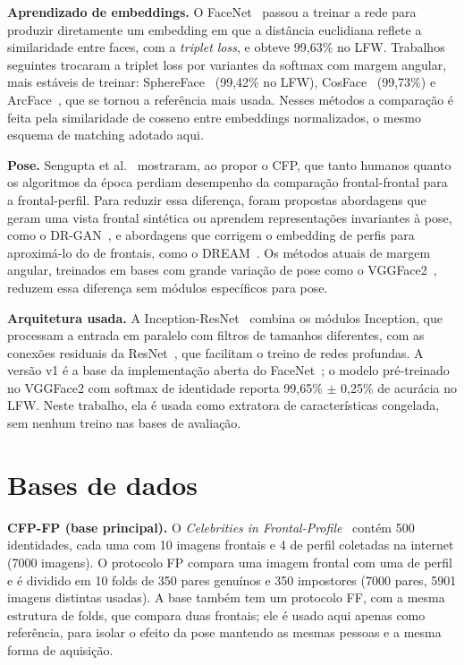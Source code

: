 \documentclass[conference,a4paper]{IEEEtran}
\begin{document}
\textbf{Aprendizado de embeddings.} O FaceNet~\cite{schroff2015facenet} passou a
treinar a rede para produzir diretamente um embedding em que a distância euclidiana
reflete a similaridade entre faces, com a \emph{triplet loss}, e obteve 99,63\% no
LFW. Trabalhos seguintes trocaram a triplet loss por variantes da softmax com margem
angular, mais estáveis de treinar: SphereFace~\cite{liu2017sphereface} (99,42\% no
LFW), CosFace~\cite{wang2018cosface} (99,73\%) e ArcFace~\cite{deng2019arcface}, que
se tornou a referência mais usada. Nesses métodos a comparação é feita pela
similaridade de cosseno entre embeddings normalizados, o mesmo esquema de matching
adotado aqui.

\textbf{Pose.} Sengupta et al.~\cite{sengupta2016frontal} mostraram, ao propor o CFP,
que tanto humanos quanto os algoritmos da época perdiam desempenho da comparação
frontal-frontal para a frontal-perfil. Para reduzir essa diferença, foram propostas
abordagens que geram uma vista frontal sintética ou aprendem representações
invariantes à pose, como o DR-GAN~\cite{tran2017disentangled}, e abordagens que
corrigem o embedding de perfis para aproximá-lo do de frontais, como o
DREAM~\cite{cao2018pose}. Os métodos atuais de margem angular, treinados em bases com
grande variação de pose como o VGGFace2~\cite{cao2018vggface2}, reduzem essa
diferença sem módulos específicos para pose.

\textbf{Arquitetura usada.} A Inception-ResNet~\cite{szegedy2017inception} combina os
módulos Inception, que processam a entrada em paralelo com filtros de tamanhos
diferentes, com as conexões residuais da ResNet~\cite{he2016deep}, que facilitam o
treino de redes profundas. A versão v1 é a base da implementação aberta do
FaceNet~\cite{sandberg_facenet}; o modelo pré-treinado no VGGFace2 com softmax de
identidade reporta 99,65\% $\pm$ 0,25\% de acurácia no LFW. Neste trabalho, ela é
usada como extratora de características congelada, sem nenhum treino nas bases de
avaliação.

\section{Bases de dados}
\textbf{CFP-FP (base principal).} O \emph{Celebrities in Frontal-Profile}~\cite{sengupta2016frontal}
contém 500 identidades, cada uma com 10 imagens frontais e 4 de perfil coletadas na
internet (\num{7000} imagens). O protocolo FP compara uma imagem frontal com uma de
perfil e é dividido em 10 folds de 350 pares genuínos e 350 impostores
(\num{7000} pares, \num{5901} imagens distintas usadas). A base também tem um
protocolo FF, com a mesma estrutura de folds, que compara duas frontais; ele é usado
aqui apenas como referência, para isolar o efeito da pose mantendo as mesmas pessoas e
a mesma forma de aquisição.
\end{document}
